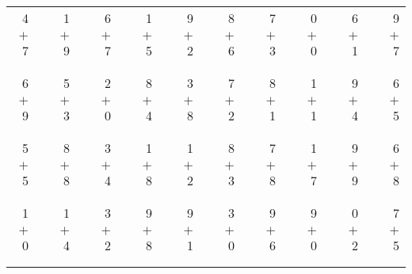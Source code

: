 \documentclass[12pt, letterpaper]{article}
\begin{document}
\begin{tabular}{rrrrrrrrrrrrrrrrrrr}
4 & & 1 & & 6 & & 1 & & 9 & & 8 & & 7 & & 0 & & 6 & & 9\\
$+$ 7 & & $+$ 9 & & $+$ 7 & & $+$ 5 & & $+$ 2 & & $+$ 6 & & $+$ 3 & & $+$ 0 & & $+$ 1 & & $+$ 7\\
\cline{1-1} \cline{3-3} \cline{5-5} \cline{7-7} \cline{9-9} \cline{11-11} \cline{13-13} \cline{15-15} \cline{17-17} \cline{19-19} \\ \\
6 & & 5 & & 2 & & 8 & & 3 & & 7 & & 8 & & 1 & & 9 & & 6\\
$+$ 9 & & $+$ 3 & & $+$ 0 & & $+$ 4 & & $+$ 8 & & $+$ 2 & & $+$ 1 & & $+$ 1 & & $+$ 4 & & $+$ 5\\
\cline{1-1} \cline{3-3} \cline{5-5} \cline{7-7} \cline{9-9} \cline{11-11} \cline{13-13} \cline{15-15} \cline{17-17} \cline{19-19} \\ \\
5 & & 8 & & 3 & & 1 & & 1 & & 8 & & 7 & & 1 & & 9 & & 6\\
$+$ 5 & & $+$ 8 & & $+$ 4 & & $+$ 8 & & $+$ 2 & & $+$ 3 & & $+$ 8 & & $+$ 7 & & $+$ 9 & & $+$ 8\\
\cline{1-1} \cline{3-3} \cline{5-5} \cline{7-7} \cline{9-9} \cline{11-11} \cline{13-13} \cline{15-15} \cline{17-17} \cline{19-19} \\ \\
1 & & 1 & & 3 & & 9 & & 9 & & 3 & & 9 & & 9 & & 0 & & 7\\
$+$ 0 & & $+$ 4 & & $+$ 2 & & $+$ 8 & & $+$ 1 & & $+$ 0 & & $+$ 6 & & $+$ 0 & & $+$ 2 & & $+$ 5\\
\cline{1-1} \cline{3-3} \cline{5-5} \cline{7-7} \cline{9-9} \cline{11-11} \cline{13-13} \cline{15-15} \cline{17-17} \cline{19-19} \\ \\
\end{tabular}
\newpage
\end{document}

